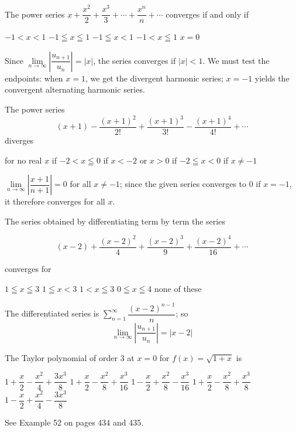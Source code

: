 \question\label{calc10:radius-ln}
The power series $x+\dfrac{x^{2}}{2}+\dfrac{x^{3}}{3}+\cdots+\dfrac{x^{n}}{n}+\cdots$ converges if and only if
\begin{choices}
  \choice $-1<x<1$
  \choice $-1 \leqq x \leqq 1$
  \CorrectChoice $-1 \leqq x<1$
  \choice $-1<x \leqq 1$
  \choice $x=0$
\end{choices}
\begin{solution}
Since $\lim\limits_{n \to \infty}\left|\dfrac{u_{n+1}}{u_{n}}\right|=|x|$, the series converges if $|x|<1$. We must test the endpoints: when $x=1$, we get the divergent harmonic series; $x=-1$ yields the convergent alternating harmonic series.
\end{solution}



\newpage




\question
The power series
\[
(x+1)-\dfrac{(x+1)^{2}}{2!}+\dfrac{(x+1)^{3}}{3!}-\dfrac{(x+1)^{4}}{4!}+\cdots
\]
diverges
\begin{choices}
  \CorrectChoice for no real $x$
  \choice if $-2<x \leqq 0$
  \choice if $x<-2$ or $x>0$
  \choice if $-2 \leqq x<0$
  \choice if $x \neq-1$
\end{choices}
\begin{solution}
$\lim\limits_{n \to \infty}\left|\dfrac{x+1}{n+1}\right|=0$ for all $x \neq-1$; since the given series converges to 0 if $x=-1$, it therefore converges for all $x$.
\end{solution}

\question
The series obtained by differentiating term by term the series

\[
(x-2)+\dfrac{(x-2)^{2}}{4}+\dfrac{(x-2)^{3}}{9}+\dfrac{(x-2)^{4}}{16}+\cdots
\]

converges for
\begin{choices}
  \choice $1 \leqq x \leqq 3$
  \CorrectChoice $1 \leqq x<3$
  \choice $1<x \leqq 3$
  \choice $0 \leqq x \leqq 4$
  \choice none of these
\end{choices}
\begin{solution}
The differentiated series is $\sum\limits_{n=1}^{\infty} \dfrac{(x-2)^{n-1}}{n}$; so
\[
\lim\limits_{n \to \infty}\left|\dfrac{u_{n+1}}{u_{n}}\right|=|x-2|
\]
\end{solution}



\newpage




\question
The Taylor polynomial of order 3 at $x=0$ for $f(x)=\sqrt{1+x}$ is
\begin{choices}
  \choice $1+\dfrac{x}{2}-\dfrac{x^{2}}{4}+\dfrac{3 x^{3}}{8}$
  \CorrectChoice $1+\dfrac{x}{2}-\dfrac{x^{2}}{8}+\dfrac{x^{3}}{16}$
  \choice $1-\dfrac{x}{2}+\dfrac{x^{2}}{8}-\dfrac{x^{3}}{16}$
  \choice $1+\dfrac{x}{2}-\dfrac{x^{2}}{8}+\dfrac{x^{3}}{8}$
  \choice $1-\dfrac{x}{2}+\dfrac{x^{2}}{4}-\dfrac{3 x^{3}}{8}$
\end{choices}
\begin{solution}
See Example 52 on pages 434 and 435.
\end{solution}

